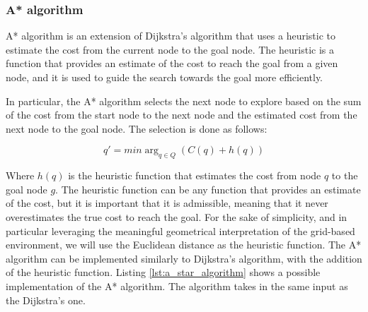 \subsubsection{A* algorithm}
\label{sec:a_star_algorithm}

A* algorithm is an extension of Dijkstra's algorithm that uses a heuristic to estimate the cost from the current node to the goal node.
The heuristic is a function that provides an estimate of the cost to reach the goal from a given node, and it is used to guide the search towards the goal more efficiently.

In particular, the A* algorithm selects the next node to explore based on the sum of the cost from the start node to the next node and the estimated cost from the next node to the goal node.
The selection is done as follows:

\begin{equation}
    q' = min\arg_{q \in Q} (C(q) + h(q))
\end{equation}

Where $h(q)$ is the heuristic function that estimates the cost from node $q$ to the goal node $g$.
The heuristic function can be any function that provides an estimate of the cost, but it is important that it is admissible, meaning that it never overestimates the true cost to reach the goal.
For the sake of simplicity, and in particular leveraging the meaningful geometrical interpretation of the grid-based environment, we will use the Euclidean distance as the heuristic function.
The A* algorithm can be implemented similarly to Dijkstra's algorithm, with the addition of the heuristic function.
Listing \ref{lst:a_star_algorithm} shows a possible implementation of the A* algorithm.
The algorithm takes in the same input as the Dijkstra's one.

